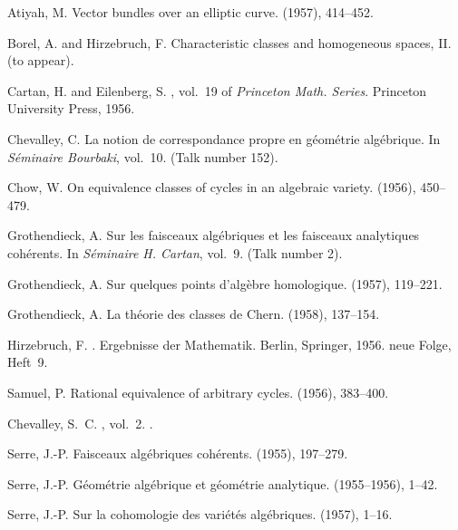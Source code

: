 \documentclass{article}
\theoremstyle{plain}
\theoremstyle{definition}
\begin{document}
\begin{thebibliography}{10}

  {\sc Atiyah, M.}
  \newblock Vector bundles over an elliptic curve.
   (1957), 414--452.

  {\sc Borel, A. and Hirzebruch, F.}
  \newblock Characteristic classes and homogeneous spaces, {II}.
   (to appear).

  {\sc Cartan, H. and Eilenberg, S.}
  , vol.~19 of {\em Princeton Math. Series}.
  \newblock Princeton University Press, 1956.

  {\sc Chevalley, C.}
  \newblock La notion de correspondance propre en g\'{e}om\'{e}trie alg\'{e}brique.
  \newblock In {\em S\'{e}minaire Bourbaki}, vol.~10.
  \newblock (Talk number 152).

  {\sc Chow, W.}
  \newblock On equivalence classes of cycles in an algebraic variety.
   (1956), 450--479.

  {\sc Grothendieck, A.}
  \newblock Sur les faisceaux alg\'{e}briques et les faisceaux analytiques
    coh\'{e}rents.
  \newblock In {\em S\'{e}minaire H. Cartan}, vol.~9.
  \newblock (Talk number 2).

  {\sc Grothendieck, A.}
  \newblock Sur quelques points d'alg\`{e}bre homologique.
   (1957), 119--221.

  {\sc Grothendieck, A.}
  \newblock La th\'{e}orie des classes de Chern.
   (1958), 137--154.

  {\sc Hirzebruch, F.}
  .
  \newblock Ergebnisse der Mathematik. Berlin, Springer, 1956.
  \newblock neue Folge, Heft~9.

  {\sc Samuel, P.}
  \newblock Rational equivalence of arbitrary cycles.
   (1956), 383--400.

  {\sc Chevalley, S.~C.}
  , vol.~2.
  .

  {\sc Serre, J.-P.}
  \newblock Faisceaux alg\'{e}briques coh\'{e}rents.
   (1955), 197--279.

  {\sc Serre, J.-P.}
  \newblock G\'{e}om\'{e}trie alg\'{e}brique et g\'{e}om\'{e}trie analytique.
   (1955--1956), 1--42.

  {\sc Serre, J.-P.}
  \newblock Sur la cohomologie des vari\'{e}t\'{e}s alg\'{e}briques.
   (1957), 1--16.

\end{thebibliography}
\end{document}
